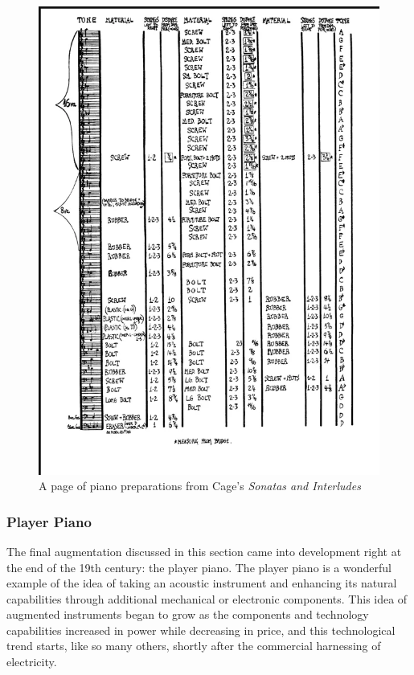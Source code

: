 \begin{figure}
    \centering
    \includegraphics[scale=0.6]{Scores/image_2023-05-08_184813894.png}
    \caption{A page of piano preparations from Cage's \textit{Sonatas and Interludes}}
    \label{fig:siPrep} %
\end{figure}


\subsubsection{Player Piano}

The final augmentation discussed in this section came into development right at the end of the 19th century: the player piano. The player piano is a wonderful example of the idea of taking an acoustic instrument and enhancing its natural capabilities through additional mechanical or electronic components. This idea of augmented instruments began to grow as the components and technology capabilities increased in power while decreasing in price, and this technological trend starts, like so many others, shortly after the commercial harnessing of electricity.

